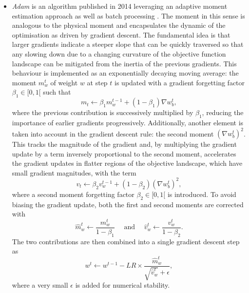 \begin{itemize}[leftmargin=*]
    \item \textit{Adam} is an algorithm published in 2014 leveraging an adaptive moment estimation approach as well as batch processing \cite{adamPaper}. The moment in this sense is analogous to the physical moment and encapsulates the dynamic of the optimisation as driven by gradient descent. The fundamental idea is that larger gradients indicate a steeper slope that can be quickly traversed so that any slowing down due to a changing curvature of the objective function landscape can be mitigated from the inertia of the previous gradients. This behaviour is implemented as an exponentially decaying moving average: the moment $m^t_w$ of weight $w$ at step $t$ is updated with a gradient forgetting factor $\beta_1 \in [0, 1[$ such that \[ m_t \leftarrow \beta_1 m^{t-1}_w + (1 - \beta_1) \nabla w_b^t,\] where the previous contribution is successively multiplied by $\beta_1$, reducing the importance of earlier gradients progressively. Additionally, another element is taken into account in the gradient descent rule: the second moment $(\nabla w_b^t)^2$. This tracks the magnitude of the gradient and, by multiplying the gradient update by a term inversely proportional to the second moment, accelerates the gradient updates in flatter regions of the objective landscape, which have small gradient magnitudes, with the term \[ v_t \leftarrow \beta_2 v^{t-1}_w + (1 - \beta_2) (\nabla w_b^t)^2,\] where a second moment forgetting factor $\beta_2 \in [0, 1[$ is introduced. To avoid biasing the gradient update, both the first and second moments are corrected with \[\hat{m}^t_w \leftarrow \frac{m^t_w}{1 - \beta_1} \quad \text{ and } \quad  \hat{v}^t_w \leftarrow \frac{v^t_w}{1 - \beta_2}.\] The two contributions are then combined into a single gradient descent step as
    \begin{equation}\label{eq:adam}
        w^{t} \leftarrow w^{t-1} - LR \times \frac{\hat{m}^t_w}{\sqrt{\hat{v}^t_w} + \epsilon},
    \end{equation}
    where a very small $\epsilon$ is added for numerical stability.
\end{itemize}

